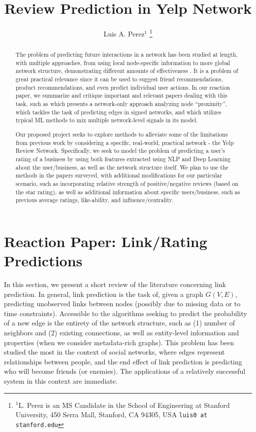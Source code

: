 \documentclass[letterpaper, 11 pt, conference]{ieeeconf}  %
\title{\LARGE \bf
Review Prediction in Yelp Network}
\author{Luis A. Perez$^{1}$%
\thanks{$^{1}$L. Perez is an MS Candidate in the School of Engineering at Stanford University,
        450 Serra Mall, Stanford, CA 94305, USA
        {\tt\small luis0 at stanford.edu}}%
}
\begin{document}
\maketitle
\thispagestyle{empty}
\pagestyle{empty}


\begin{abstract}

The problem of predicting future interactions in a network has been studied at length, with multiple approaches, from using local node-specific information to more global network structure, demonstrating different amounts of effectiveness \cite{PintrestProject}. It is a problem of great practical relevance since it can be used to suggest friend recommendations, product recommendations, and even predict individual user actions. In our reaction paper, we summarize and critique important and relevant papers dealing with this task, such as \cite{TheLinkPredictionProblemForSocialNetworks} which presents a network-only approach analyzing node ``proximity'', \cite{Leskovec:2010:PPN:1772690.1772756} which tackles the task of predicting edges in signed networks, and \cite{Hasan06linkprediction} which utilizes typical ML methods to mix multiple network-level signals in its model.

Our proposed project seeks to explore methods to alleviate some of the limitations from previous work by considering a specific, real-world, practical network - the Yelp Review Network. Specifically, we seek to model the problem of predicting a user's rating of a business by using both features extracted using NLP and Deep Learning about the user/business, as well as the network structure itself. We plan to use the methods in the papers surveyed, with additional modifications for our particular scenario, such as incorporating relative strength of positive/negative reviews (based on the star rating), as well as additional information about specific users/business, such as previous average ratings, like-ability, and influence/centrality.

\end{abstract}


\section{Reaction Paper: Link/Rating Predictions}
In this section, we present a short review of the literature concerning link prediction. In general, link prediction is the task of, given a graph $G(V,E)$, predicting unobserved links between nodes (possibly due to missing data or to time constraints). Accessible to the algorithms seeking to predict the probability of a new edge is the entirety of the network structure, such as (1) number of neighbors and (2) existing connections, as well as entity-level information and properties (when we consider metadata-rich graphs). This problem has been studied the most in the context of social networks, where edges represent relationships between people, and the end effect of link prediction is predicting who will become friends (or enemies). The applications of a relatively successful system in this context are immediate.
\end{document}
